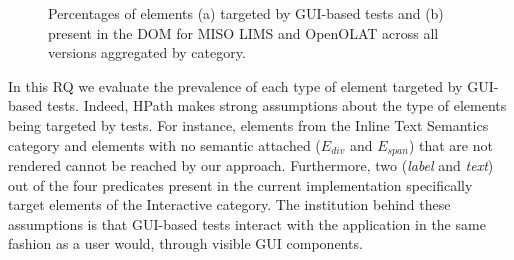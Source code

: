 \begin{figure}
\centering
{}
\caption{Percentages of elements (a) targeted by GUI-based tests and (b) present in the DOM for MISO LIMS and OpenOLAT across all versions aggregated by category.}  
\label{fig:hpath-results-frequency}
\end{figure}

In this RQ we evaluate the prevalence of each type of element targeted by GUI-based tests. Indeed, HPath makes strong assumptions about the type of elements being targeted by tests. For instance, elements from the Inline Text Semantics category and elements with no semantic attached ($E_{div}$ and $E_{span}$) that are not rendered cannot be reached by our approach. Furthermore, two (\emph{label} and \emph{text}) out of the four predicates present in the current implementation specifically target elements of the Interactive category. The institution behind these assumptions is that GUI-based tests interact with the application in the same fashion as a user would, through visible GUI components. 

